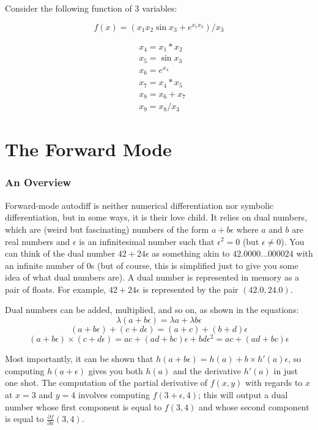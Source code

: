Consider the following function of 3 variables:

$$
f(x)=\left(x_{1} x_{2} \sin x_{3}+e^{x_{1} x_{2}}\right) / x_{3}
$$

$$
\begin{aligned}
& x_{4}=x_{1} * x_{2} \\
& x_{5}=\sin x_{3} \\
& x_{6}=e^{x_{4}} \\
& x_{7}=x_{4} * x_{5} \\
& x_{8}=x_{6}+x_{7} \\
& x_{9}=x_{8} / x_{3}
\end{aligned}
$$



\section*{The Forward Mode}

\subsubsection*{An Overview}
Forward-mode autodiff is neither numerical differentiation nor symbolic differentiation, but in some ways, it is their love child. It relies on dual numbers, which are (weird but fascinating) numbers of the form \(a + b\epsilon\) where \(a\) and \(b\) are real numbers and \(\epsilon\) is an infinitesimal number such that \(\epsilon^2 = 0\) (but \(\epsilon \neq 0\)). You can think of the dual number \(42 + 24\epsilon\) as something akin to \(42.0000\ldots000024\) with an infinite number of 0s (but of course, this is simplified just to give you some idea of what dual numbers are). A dual number is represented in memory as a pair of floats. For example, \(42 + 24\epsilon\) is represented by the pair \((42.0, 24.0)\).

Dual numbers can be added, multiplied, and so on, as shown in the equations:
\[
\lambda (a + b\epsilon) = \lambda a + \lambda b\epsilon
\]
\[
(a + b\epsilon) + (c + d\epsilon) = (a + c) + (b + d)\epsilon
\]
\[
(a + b\epsilon) \times (c + d\epsilon) = ac + (ad + bc)\epsilon + bd\epsilon^2 = ac + (ad + bc)\epsilon
\]

Most importantly, it can be shown that \(h(a + b\epsilon) = h(a) + b \times h'(a)\epsilon\), so computing \(h(a + \epsilon)\) gives you both \(h(a)\) and the derivative \(h'(a)\) in just one shot. The computation of the partial derivative of \(f(x, y)\) with regards to \(x\) at \(x = 3\) and \(y = 4\) involves computing \(f(3 + \epsilon, 4)\); this will output a dual number whose first component is equal to \(f(3, 4)\) and whose second component is equal to \(\frac{\partial f}{\partial x}(3, 4)\).

